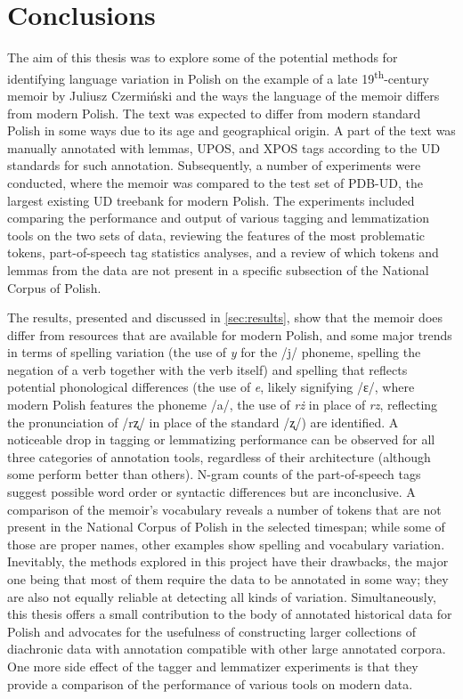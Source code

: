 \section{Conclusions}
\label{sec:conclusions}

The aim of this thesis was to explore some of the potential methods for identifying language variation in Polish on the example of a late 19\textsuperscript{th}-century memoir by Juliusz Czermiński and the ways the language of the memoir differs from modern Polish. The text was expected to differ from modern standard Polish in some ways due to its age and geographical origin. A part of the text was manually annotated with lemmas, UPOS, and XPOS tags according to the UD standards for such annotation. Subsequently, a number of experiments were conducted, where the memoir was compared to the test set of PDB-UD, the largest existing UD treebank for modern Polish. The experiments included comparing the performance and output of various tagging and lemmatization tools on the two sets of data, reviewing the features of the most problematic tokens, part-of-speech tag statistics analyses, and a review of which tokens and lemmas from the data are not present in a specific subsection of the National Corpus of Polish.

The results, presented and discussed in \autoref{sec:results}, show that the memoir does differ from resources that are available for modern Polish, and some major trends in terms of spelling variation (the use of \textit{y} for the /j/ phoneme, spelling the negation of a verb together with the verb itself) and spelling that reflects potential phonological differences (the use of \textit{e}, likely signifying /ɛ/, where modern Polish features the phoneme /a/, the use of \textit{rż} in place of \textit{rz}, reflecting the pronunciation of /rʐ/ in place of the standard /ʐ/) are identified. A noticeable drop in tagging or lemmatizing performance can be observed for all three categories of annotation tools, regardless of their architecture (although some perform better than others). N-gram counts of the part-of-speech tags suggest possible word order or syntactic differences but are inconclusive. A comparison of the memoir's vocabulary reveals a number of tokens that are not present in the National Corpus of Polish in the selected timespan; while some of those are proper names, other examples show spelling and vocabulary variation. Inevitably, the methods explored in this project have their drawbacks, the major one being that most of them require the data to be annotated in some way; they are also not equally reliable at detecting all kinds of variation. Simultaneously, this thesis offers a small contribution to the body of annotated historical data for Polish and advocates for the usefulness of constructing larger collections of diachronic data with annotation compatible with other large annotated corpora. One more side effect of the tagger and lemmatizer experiments is that they provide a comparison of the performance of various tools on modern data.

